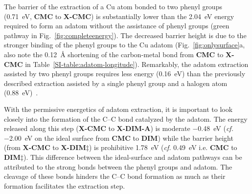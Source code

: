 \documentclass[aps,prb,amsmath,amssymb,11pt]{revtex4-1}
\newcommand{\zhzh}{\color{black}}
\renewcommand{\sout}[1]{\unskip}
\begin{document}
\sout{It is remarkable that the energy of the extraction of a copper atom bonded to two phenyl groups is only 0.16~eV, dramatically lower than the 1.76~eV energy required to extract an adatom from the ideal clean surface (green pathway in Fig.~\ref{fig:completeenergy}). The 0.71~eV barrier height for the phenyl-assisted extraction is also substantially lower than the 2.04~eV barrier of unassisted extraction due to the stronger binding of the phenyl groups to the Cu adatom (Fig.~\ref{fig:onlysurface}a). This strengthening is also manifest in the 0.12\AA\ decrease in the carbon-metal bond length during the \textbf{CMC} to \textbf{X-CMC} transformation (Table~\ref{SI-table:adatom-longitude}).}
%
{\zhzh The barrier of the extraction of a Cu atom bonded to two phenyl groups (\SI{0.71}{\electronvolt}, \textbf{CMC} to \textbf{X-CMC}) is substantially lower than the \SI{2.04}{\electronvolt} energy required to form an adatom without the assistance of phenyl groups (green pathway in Fig.~\ref{fig:completeenergy}). The decreased barrier height is due to the stronger binding of the phenyl groups to the Cu adatom (Fig.~\ref{fig:onlysurface}a, also note the \SI{0.12}{\angstrom} shortening of the carbon-metal bond from \textbf{CMC} to \textbf{X-CMC} in Table~\ref{SI-table:adatom-longitude}).} 
%
\sout{It is also worth noting that} {\zhzh Remarkably,} the adatom extraction assisted by two phenyl groups requires less energy {\zhzh (\SI{0.16}{\electronvolt})} than the previously described extraction assisted by a single phenyl group and a halogen atom {\zhzh (\SI{0.88}{\electronvolt})}~\cite{chemeurope2017}. \sout{, which can happen immediately after the dehalogenation step~\cite{chemeurope2017}. In the previous study~\cite{chemeurope2017}, which used different slab models and different density functional, the energy of the extraction of a copper atom assisted by phenyl and iodine was calculated to be 0.88~eV (cf. 0.16~eV phenyl-assisted extraction here).}

With the permissive energetics of adatom extraction, it is important to look closely into the formation of the C--C bond catalyzed by the adatom\sout{ (\textbf{X-CMC}, \textbf{X-DIM$\ddagger$}, \textbf{X-DIM-A})}.
\sout{In contrast to the C--C bond formation on the ideal surface, t} {\zhzh T}he energy released along this step {\zhzh (\textbf{X-CMC} to \textbf{X-DIM-A})} is moderate \SI{-0.48}{\electronvolt} (\textit{cf.} \SI{-2.00}{\electronvolt} on the ideal surface {\zhzh from \textbf{CMC} to \textbf{DIM}}) while the barrier height {\zhzh (from \textbf{X-CMC} to \textbf{X-DIM$\ddagger$})} is prohibitive \SI{1.78}{\electronvolt} (\textit{cf.} \SI{0.49}{\electronvolt} {\zhzh i.e. \textbf{CMC} to \textbf{DIM$\ddagger$}}). 
This difference between the ideal-surface and adatom pathways can be attributed to the strong bonds between the phenyl groups and adatom.
{\zhzh The cleavage of these bonds}\sout{Their cleavage} hinders the C--C bond formation as much as their formation facilitates the extraction step.
\end{document}
